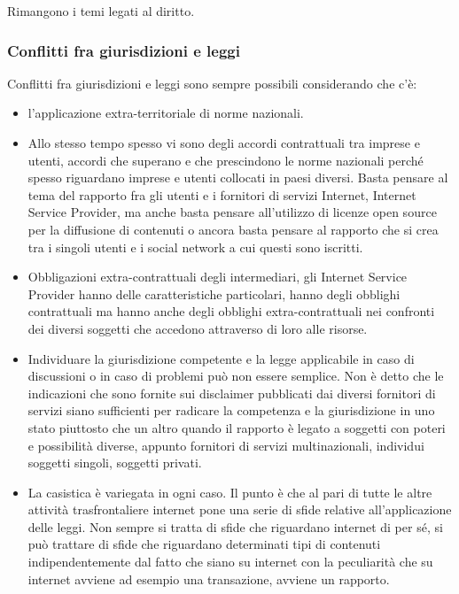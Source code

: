 Rimangono i temi legati al diritto.

\subsubsection{Conflitti fra giurisdizioni e leggi}

Conflitti fra giurisdizioni e leggi sono sempre possibili considerando che c'è:
\begin{itemize}
    \item l'applicazione extra-territoriale di norme nazionali.
    \item Allo stesso tempo spesso vi sono degli accordi contrattuali tra imprese e utenti, accordi che superano e che prescindono le norme nazionali perché spesso riguardano imprese e utenti collocati in paesi diversi. Basta pensare al tema del rapporto fra gli utenti e i fornitori di servizi Internet, Internet Service Provider, ma anche basta pensare all'utilizzo di licenze open source per la diffusione di contenuti o ancora basta pensare al rapporto che si crea tra i singoli utenti e i social network a cui questi sono iscritti.
    \item Obbligazioni extra-contrattuali degli intermediari, gli Internet Service Provider hanno delle caratteristiche particolari, hanno degli obblighi contrattuali ma hanno anche degli obblighi extra-contrattuali nei confronti dei diversi soggetti che accedono attraverso di loro alle risorse.
    \item Individuare la giurisdizione competente e la legge applicabile in caso di discussioni o in caso di problemi può non essere semplice. Non è detto che le indicazioni che sono fornite sui disclaimer pubblicati dai diversi fornitori di servizi siano sufficienti per radicare la competenza e la giurisdizione in uno stato piuttosto che un altro quando il rapporto è legato a soggetti con poteri e possibilità diverse, appunto fornitori di servizi multinazionali, individui soggetti singoli, soggetti privati.
    \item La casistica è variegata in ogni caso. Il punto è che al pari di tutte le altre attività trasfrontaliere internet pone una serie di sfide relative all'applicazione delle leggi. Non sempre si tratta di sfide che riguardano internet di per sé, si può trattare di sfide che riguardano determinati tipi di contenuti indipendentemente dal fatto che siano su internet con la peculiarità che su internet avviene ad esempio una transazione, avviene un rapporto.\par
\end{itemize}

